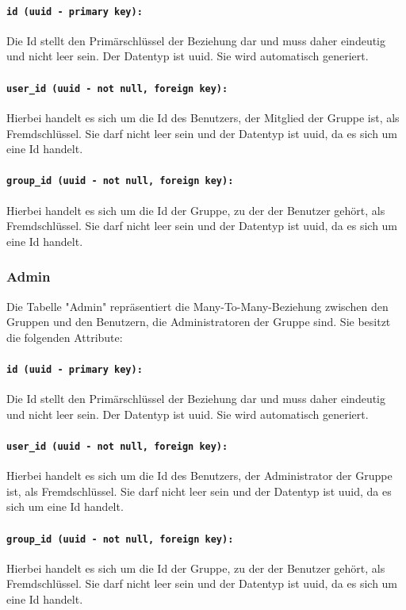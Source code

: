 \documentclass{entwurfsheft}
\begin{document}
\paragraph{\texttt{id (uuid - primary key):}} Die Id stellt den Primärschlüssel der Beziehung dar und muss daher eindeutig und nicht leer sein. Der Datentyp ist \Gls{uuid}. Sie wird automatisch generiert.
\paragraph{\texttt{user\_id (uuid - not null, foreign key):}} Hierbei handelt es sich um die Id des Benutzers, der Mitglied der Gruppe ist, als Fremdschlüssel. Sie darf nicht leer sein und der Datentyp ist \Gls{uuid}, da es sich um eine Id handelt.
\paragraph{\texttt{group\_id (uuid - not null, foreign key):}} Hierbei handelt es sich um die Id der Gruppe, zu der der Benutzer gehört, als Fremdschlüssel. Sie darf nicht leer sein und der Datentyp ist \Gls{uuid}, da es sich um eine Id handelt.
\newpage
\subsubsection{Admin}
Die Tabelle "Admin" repräsentiert die Many-To-Many-Beziehung zwischen den Gruppen und den Benutzern, die Administratoren der Gruppe sind. Sie besitzt die folgenden Attribute:
\paragraph{\texttt{id (uuid - primary key):}} Die Id stellt den Primärschlüssel der Beziehung dar und muss daher eindeutig und nicht leer sein. Der Datentyp ist \Gls{uuid}. Sie wird automatisch generiert.
\paragraph{\texttt{user\_id (uuid - not null, foreign key):}} Hierbei handelt es sich um die Id des Benutzers, der Administrator der Gruppe ist, als Fremdschlüssel. Sie darf nicht leer sein und der Datentyp ist \Gls{uuid}, da es sich um eine Id handelt.
\paragraph{\texttt{group\_id (uuid - not null, foreign key):}} Hierbei handelt es sich um die Id der Gruppe, zu der der Benutzer gehört, als Fremdschlüssel. Sie darf nicht leer sein und der Datentyp ist \Gls{uuid}, da es sich um eine Id handelt.
\newpage
\end{document}
